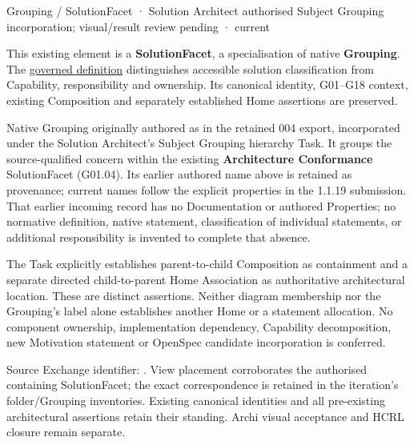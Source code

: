 \label{element:b47210a43fe147d4a3f2fbc081321063}
{\small Grouping / SolutionFacet · Solution Architect authorised Subject Grouping incorporation; visual/result review pending · current}\par

This existing element is a \textbf{SolutionFacet}, a specialisation of native
\textbf{Grouping}. The \href{\detokenize{../../../../../../../governance/continuum-representation.md#solutionfacet-classification--1119-candidate}}{governed definition}
distinguishes accessible solution classification from Capability, responsibility
and ownership. Its canonical identity, G01–G18 context, existing Composition
and separately established Home assertions are preserved.



Native Grouping originally authored as \texttt{} in the retained 004 export,
incorporated under the Solution Architect's Subject Grouping hierarchy Task.
It groups the source-qualified \texttt{} concern within
the existing \textbf{Architecture Conformance} SolutionFacet (G01.04). Its earlier authored name above is retained as provenance; current names
follow the explicit properties in the 1.1.19 submission.
That earlier incoming record has no Documentation or authored Properties; no normative
definition, native statement, classification of individual statements, or
additional responsibility is invented to complete that absence.



The Task explicitly establishes parent-to-child Composition as containment and
a separate directed child-to-parent Home Association as authoritative architectural
location. These are distinct assertions. Neither diagram membership nor the
Grouping's label alone establishes another Home or a statement allocation.
No component ownership, implementation dependency, Capability decomposition,
new Motivation statement or OpenSpec candidate incorporation is conferred.



Source Exchange identifier: \texttt{}. View placement corroborates
the authorised containing SolutionFacet; the exact correspondence is retained in the
iteration's folder/Grouping inventories. Existing canonical identities and all
pre-existing architectural assertions retain their standing. Archi visual
acceptance and HCRL closure remain separate.


